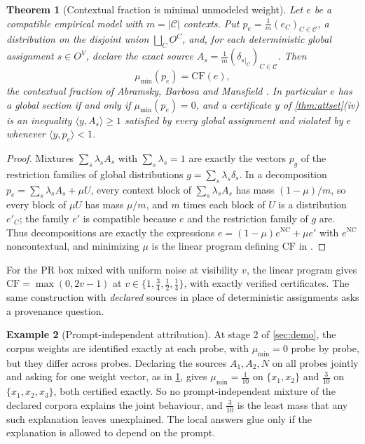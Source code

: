 \documentclass[11pt]{article}
\newtheorem{theorem}{Theorem}[section]
\theoremstyle{definition}
\newtheorem{example}[theorem]{Example}
\theoremstyle{remark}
\begin{document}
\begin{theorem}[Contextual fraction is minimal unmodeled weight]\label{thm:cf}
Let $e$ be a compatible empirical model with $m=\lvert\mathcal C\rvert$ contexts. Put
$p_e=\tfrac1m(e_C)_{C\in\mathcal C}$, a distribution on the disjoint union $\bigsqcup_CO^C$, and, for each
deterministic global assignment $s\in O^V$, declare the exact source
$A_s=\tfrac1m(\delta_{s|_C})_{C\in\mathcal C}$. Then
\[
\mu_{\min}(p_e)=\mathrm{CF}(e),
\]
the contextual fraction of Abramsky, Barbosa and Mansfield \cite{ABM2017}. In particular $e$ has a
global section if and only if $\mu_{\min}(p_e)=0$, and a certificate $y$ of \cref{thm:attset}(iv) is
an inequality $\langle y,A_s\rangle\ge1$ satisfied by every global assignment and violated by $e$
whenever $\langle y,p_e\rangle<1$.
\end{theorem}
\begin{proof}
Mixtures $\sum_s\lambda_sA_s$ with $\sum_s\lambda_s=1$ are exactly the vectors $p_g$ of the restriction
families of global distributions $g=\sum_s\lambda_s\delta_s$. In a decomposition
$p_e=\sum_s\lambda_sA_s+\mu U$, every context block of $\sum_s\lambda_sA_s$ has mass
$(1-\mu)/m$, so every block of $\mu U$ has mass $\mu/m$, and $m$ times each block of $U$ is a distribution $e'_C$; the family $e'$ is
compatible because $e$ and the restriction family of $g$ are. Thus decompositions are exactly the
expressions $e=(1-\mu)e^{\mathrm{NC}}+\mu e'$ with $e^{\mathrm{NC}}$ noncontextual, and minimizing $\mu$
is the linear program defining $\mathrm{CF}$ in \cite{ABM2017}.
\end{proof}

For the PR box mixed with uniform noise at visibility $v$, the linear program gives
$\mathrm{CF}=\max(0,2v-1)$ at $v\in\{1,\tfrac34,\tfrac12,\tfrac14\}$, with exactly verified
certificates. The same construction with \emph{declared} sources in place of deterministic
assignments asks a provenance question.

\begin{example}[Prompt-independent attribution]\label{ex:global-attr}
At stage 2 of \cref{sec:demo}, the corpus weights are identified exactly at each probe, with
$\mu_{\min}=0$ probe by probe, but they differ across probes. Declaring the sources $A_1,A_2,N$
on all probes jointly and asking for one weight vector, as in \cref{thm:cf}, gives
$\mu_{\min}=\tfrac1{10}$ on $\{x_1,x_2\}$ and $\tfrac3{10}$ on $\{x_1,x_2,x_3\}$, both certified exactly.
So no prompt-independent mixture of the declared corpora explains the joint behaviour, and $\tfrac3{10}$
is the least mass that any such explanation leaves unexplained. The local answers glue only if the
explanation is allowed to depend on the prompt.
\end{example}
\end{document}
